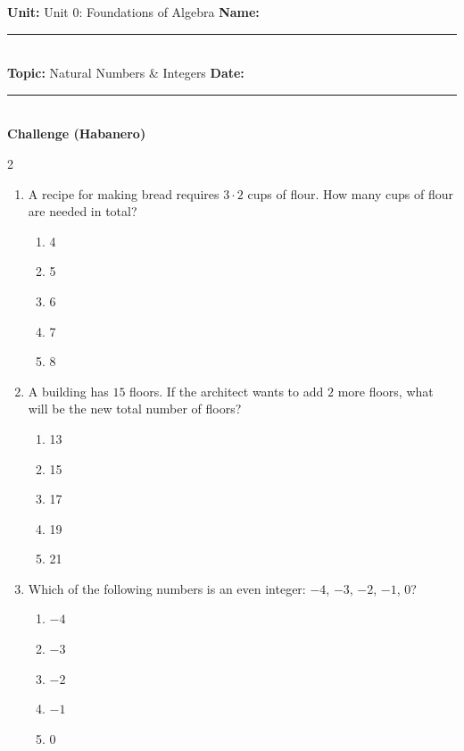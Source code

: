 \documentclass[10pt]{article}
\begin{document}
\enlargethispage{2.5cm}

\begin{tcolorbox}[colback=mainblue!5, colframe=mainblue, sharp corners, boxrule=0.5pt]
    \small \textbf{Unit:} Unit 0: Foundations of Algebra \hfill \textbf{Name:} \rule{3cm}{0.4pt} \\
    \small \textbf{Topic:} Natural Numbers & Integers \hfill \textbf{Date:} \rule{2cm}{0.4pt} \\
    \centering \textbf{\large Challenge (Habanero)}
\end{tcolorbox}

\vspace{0.2cm}

\begin{multicols}{2}
\begin{enumerate}[label=\textbf{Q\arabic*.}, leftmargin=*, itemsep=6pt, parsep=0pt]

  \item \small A recipe for making bread requires $3 \cdot 2$ cups of flour. How many cups of flour are needed in total?
  \begin{enumerate}[label=(\Alph*), leftmargin=0.6cm, nosep, itemsep=2pt]
    \item 4
    \item 5
    \item 6
    \item 7
    \item 8
  \end{enumerate}

  \item \small A building has $15$ floors. If the architect wants to add $2$ more floors, what will be the new total number of floors?
  \begin{enumerate}[label=(\Alph*), leftmargin=0.6cm, nosep, itemsep=2pt]
    \item 13
    \item 15
    \item 17
    \item 19
    \item 21
  \end{enumerate}

  \item \small Which of the following numbers is an even integer: $-4$, $-3$, $-2$, $-1$, $0$?
  \begin{enumerate}[label=(\Alph*), leftmargin=0.6cm, nosep, itemsep=2pt]
    \item $-4$
    \item $-3$
    \item $-2$
    \item $-1$
    \item $0$
  \end{enumerate}


\end{enumerate}
\end{multicols}
\end{document}
